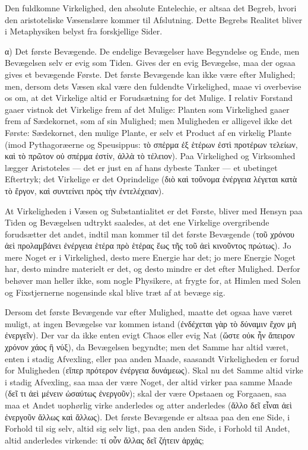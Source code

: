 \documentclass[12pt]{book}
\newcommand{\opage}[1]{\marginnote{\footnotesize\textit{[#1]}}}
\begin{document}
Den fuldkomne Virkelighed, den absolute Entelechie, er altsaa det Begreb, hvori den aristoteliske
Væsenslære kommer til Afslutning. Dette Begrebs Realitet bliver i Metaphysiken belyst fra
forskjellige Sider.

α) Det første Bevægende. De endelige Bevægelser have Begyndelse og Ende, men Bevægelsen selv er
evig som Tiden. Gives der en evig Bevægelse, maa der ogsaa gives et bevægende Første. Det første
Bevægende kan ikke være efter Mulighed; men, dersom dets Væsen skal være den fuldendte
Virkelighed, maae vi overbevise os om,
\opage{145} at det Virkelige altid er Forudsætning for det Mulige. I relativ Forstand gaaer vistnok det
Virkelige frem af det Mulige: Planten som Virkelighed gaaer frem af Sædekornet, som af sin
Mulighed; men Muligheden er alligevel ikke det Første: Sædekornet, den mulige Plante, er selv et
Product af en virkelig Plante (imod Pythagoræerne og Speusippus: τὸ σπέρμα ἐξ ἑτέρων ἐστὶ
προτέρων τελείων, καὶ τὸ πρῶτον οὐ σπέρμα ἐστίν, ἀλλὰ τὸ τέλειον). Paa Virkelighed og Virksomhed
lægger Aristoteles — det er just en af hans dybeste Tanker — et ubetinget Eftertryk; det
Virkelige er det Oprindelige (διὸ καὶ τοὔνομα ἐνέργεια λέγεται κατὰ τὸ ἔργον, καὶ συντείνει πρὸς
τὴν ἐντελέχειαν).

At Virkeligheden i Væsen og Substantialitet er det Første, bliver med Hensyn paa Tiden og
Bevægelsen udtrykt saaledes, at det ene Virkelige overgribende forudsætter det andet, indtil man
kommer til det første Bevægende (τοῦ χρόνου ἀεὶ προλαμβάνει ἐνέργεια ἑτέρα πρὸ ἑτέρας ἕως τῆς τοῦ
ἀεὶ κινοῦντος πρώτως). Jo mere Noget er i Virkelighed, desto mere Energie har det; jo mere
Energie Noget har, desto mindre materielt er det, og desto mindre er det efter Mulighed. Derfor
behøver man heller ikke, som nogle Physikere, at frygte for, at Himlen med Solen og Fixstjernerne
nogensinde skal blive træt af at bevæge sig.

Dersom det første Bevægende var efter Mulighed, maatte det ogsaa have været muligt, at ingen
Bevægelse var kommen istand (ἐνδέχεται γὰρ τὸ δύναμιν ἔχον μὴ ἐνεργεῖν). Der var da ikke enten
evigt Chaos eller evig Nat (ὥστε οὐκ ἦν ἄπειρον χρόνον χάος ἢ νύξ), da Bevægelsen begyndte; men
det Samme har altid været, enten i stadig Afvexling, eller paa anden Maade, saasandt
Virkeligheden er forud for Muligheden (εἴπερ πρότερον ἐνέργεια δυνάμεως). Skal nu det Samme altid
virke i stadig Afvexling, saa maa der være Noget, der altid virker paa samme Maade (δεῖ τι ἀεὶ
μένειν ὡσαύτως ἐνεργοῦν); skal der være Opstaaen og Forgaaen, saa maa et Andet uophørlig virke
\opage{146} anderledes og atter anderledes (ἄλλο δεῖ εἶναι ἀεὶ ἐνεργοῦν ἄλλως καὶ ἄλλως). Det første Bevægende
er altsaa paa den ene Side, i Forhold til sig selv, altid sig selv ligt, paa den anden Side, i
Forhold til Andet, altid anderledes virkende: τί οὖν ἄλλας δεῖ ζήτειν ἀρχάς;
\end{document}
